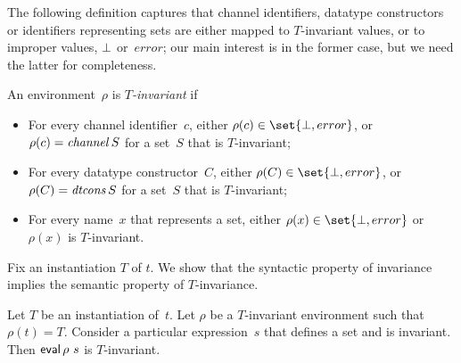 The following definition captures that channel identifiers, datatype
constructors or identifiers representing sets are either mapped to
$T$-invariant values, or to improper values, $\perp$ or~$error$; our main
interest is in the former case, but we need the latter for completeness.
%
\begin{definition}
An environment~$\rho$ is \emph{$T$-invariant} if
%
\begin{itemize}
\item For every channel identifier~$c$, either $\rho(c) \in \set{\bottom,
  error}$, or $\rho(c) = \mathop{\it channel} S$ for a set~$S$ that is $T$-invariant;

\item For every datatype constructor~$C$, either $\rho(C) \in \set{\bottom,
  error}$, or $\rho(C) = \mathop{\it dtcons} S$ for a set~$S$ that is $T$-invariant;

\item For every name~$x$ that represents a set, either $\rho(x) \in
  \set{\bottom, error}$ or $\rho(x)$ is $T$-invariant.
\end{itemize}
\end{definition}


Fix an instantiation $T$ of $t$.  We show that the syntactic property of
invariance implies the semantic property of $T$-invariance. 

\begin{lemma}
\label{lem:invariant}
Let $T$ be an instantiation of~$t$.  Let $\rho$ be a $T$-invariant environment
such that $\rho(t) = T$. 
%
Consider a particular expression~$s$ that defines a set and is invariant.
Then $\mathop{\sf eval} \rho~s$ is $T$-invariant.
\end{lemma}

